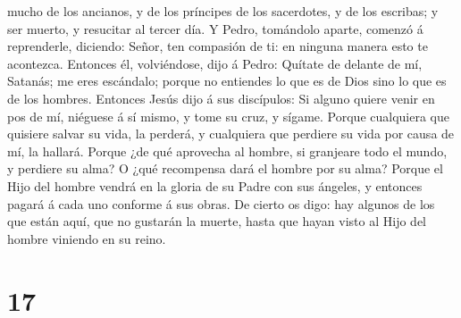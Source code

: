mucho de los ancianos, y de los príncipes de los sacerdotes, y de los
escribas; y ser muerto, y resucitar al tercer día.  Y
Pedro, tomándolo aparte, comenzó á reprenderle, diciendo: Señor, ten
compasión de ti: en ninguna manera esto te acontezca. 
Entonces él, volviéndose, dijo á Pedro: Quítate de delante de mí,
Satanás; me eres escándalo; porque no entiendes lo que es de Dios sino
lo que es de los hombres.  Entonces Jesús dijo á sus
discípulos: Si alguno quiere venir en pos de mí, niéguese á sí mismo, y
tome su cruz, y sígame.  Porque cualquiera que quisiere
salvar su vida, la perderá, y cualquiera que perdiere su vida por causa
de mí, la hallará.  Porque ¿de qué aprovecha al hombre, si
granjeare todo el mundo, y perdiere su alma? O ¿qué recompensa dará el
hombre por su alma?  Porque el Hijo del hombre vendrá en la
gloria de su Padre con sus ángeles, y entonces pagará á cada uno
conforme á sus obras.  De cierto os digo: hay algunos de
los que están aquí, que no gustarán la muerte, hasta que hayan visto al
Hijo del hombre viniendo en su reino.

\hypertarget{section-16}{%
\section{17}\label{section-16}}

